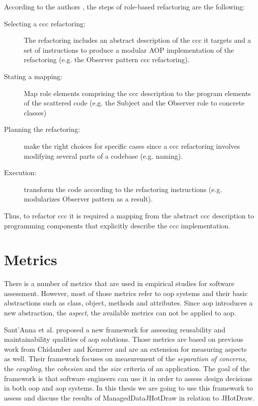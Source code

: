 According to the authors \cite{hannemann2005role}, the steps of role-based refactoring are the following:
\begin{description}

	\item [Selecting a \ac{ccc} refactoring:] The refactoring includes an abstract description of the \ac{ccc} it targets and a set of instructions to produce a modular AOP implementation of the refactoring (e.g. the Observer pattern \ac{ccc} refactoring).

	\item [Stating a mapping:] Map role elements comprising the \ac{ccc} description to the program elements of the scattered code (e.g. the Subject and the Observer role to concrete classes)

	\item [Planning the refactoring:] make the right choices for specific cases since a \ac{ccc} refactoring involves modifying several parts of a codebase (e.g. naming).

	\item [Execution:] transform the code according to the refactoring instructions (e.g. modularizes Observer pattern as a result).
\end{description}

Thus, to refactor \ac{ccc} it is required a mapping from the abstract \ac{ccc} description to programming components that explicitly describe the \ac{ccc} implementation.

\section{Metrics}\label{Background Metrics}
There is a number of metrics that are used in empirical studies for software assessment. 
However, most of those metrics refer to \ac{oop} systems \cite{chidamber1994metrics} and their basic abstractions such as class, object, methods and attributes.
Since \ac{aop} introduces a new abstraction, the \textit{aspect}, the available metrics can not be applied to \ac{aop}.

Sant'Anna et al. \cite{sant2003reuse} proposed a new framework for assessing reusability and maintainability qualities of \ac{aop} solutions.
Those metrics are based on previous work from Chidamber and Kemerer \cite{chidamber1994metrics} and are an extension for measuring aspects as well.
Their framework focuses on measurement of the \textit{separation of concerns}, the \textit{coupling}, the \textit{cohesion} and the \textit{size} criteria of an application.
The goal of the framework is that software engineers can use it in order to assess design decisions in both \ac{oop} and \ac{aop} systems.
In this thesis we are going to use this framework to assess and discuss the results of ManagedDataJHotDraw in relation to JHotDraw.

